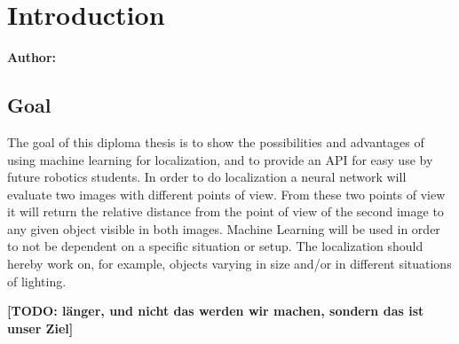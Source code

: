 \chapter{Introduction}

\textbf{Author:}

\section{Goal}
The goal of this diploma thesis is to show the possibilities and advantages of using machine learning for localization, and to provide an API for easy use by future robotics students. In order to do localization a neural network will evaluate two images with different points of view. From these two points of view it will return the relative distance from the point of view of the second image to any given object visible in both images. Machine Learning will be used in order to not be dependent on a specific situation or setup. The localization should hereby work on, for example, objects varying in size and/or in different situations of lighting.

\textbf{[TODO: länger, und nicht das werden wir machen, sondern das ist unser Ziel]}

\filbreak
